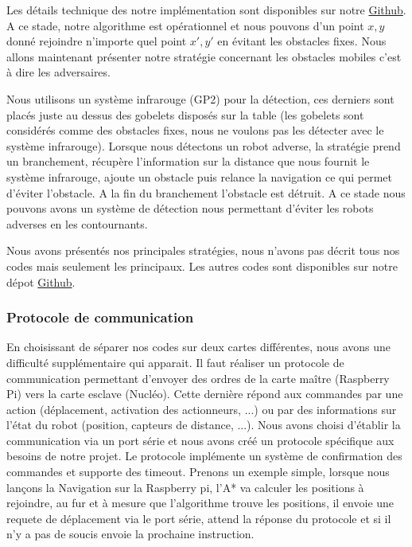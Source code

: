 \documentclass[a4paper,10pt]{article}
\begin{document}
\begin{spacing}{1.5}
Les détails technique des notre implémentation sont disponibles sur notre
\href{https://github.com/eirbot/eirbot2020-1A/blob/master/code/rasp/src/navigation.cpp}{Github}.
A ce stade, notre algorithme est opérationnel et nous pouvons d'un point $x,y$
donné rejoindre n'importe quel point $x',y'$ en évitant les obstacles fixes.
Nous allons maintenant présenter notre stratégie concernant les obstacles
mobiles c'est à dire les adversaires.

Nous utilisons un système infrarouge (GP2) pour la détection, ces derniers sont
placés juste au dessus des gobelets disposés sur la table (les gobelets sont
considérés comme des obstacles fixes, nous ne voulons pas les détecter avec le
système infrarouge). Lorsque nous détectons un robot adverse, la stratégie prend
un branchement, récupère l'information sur la distance que nous fournit le
système infrarouge, ajoute un obstacle puis relance la navigation ce qui permet d'éviter l'obstacle.
A la fin du branchement l'obstacle est détruit. A ce stade nous pouvons avons un
système de détection nous permettant d'éviter les robots adverses en les
contournants.

Nous avons présentés nos principales stratégies, nous n'avons pas décrit tous
nos codes mais seulement les principaux. Les autres codes sont disponibles sur
notre dépot \href{https://github.com/eirbot/eirbot2020-1A}{Github}.

\subsubsection{Protocole de communication}
En choisissant de séparer nos codes sur deux cartes différentes, nous avons une
difficulté supplémentaire qui apparait. Il faut réaliser un protocole de
communication permettant d'envoyer des ordres de la carte maître (Raspberry
Pi) vers la carte esclave (Nucléo). Cette dernière répond aux commandes par une
action (déplacement, activation des actionneurs, ...) ou par des
informations sur l'état du robot (position, capteurs de distance, ...). Nous
avons choisi d'établir la communication via un port série et nous avons créé un
protocole spécifique aux besoins de notre projet. Le protocole implémente un
système de confirmation des commandes et supporte des timeout. Prenons un
exemple simple, lorsque nous lançons la Navigation sur la Raspberry pi, l'A* va
calculer les positions à rejoindre, au fur et à mesure que l'algorithme trouve
les positions, il envoie une requete de déplacement via le port série, attend la
réponse du protocole et si il n'y a pas de soucis envoie la prochaine instruction.


\end{spacing}
\end{document}
